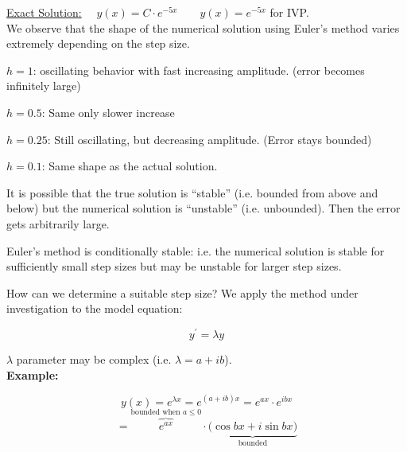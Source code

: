 \documentclass[a4paper,12pt]{report}
\begin{document}
\begin{multicols}{4}
	
	
\end{multicols}	
	\noindent \underline{Exact Solution:} $\quad y(x) = C \cdot e^{-5x} \qquad y(x) = e^{-5x}$ for IVP.\\
	
	\noindent We observe that the shape of the numerical solution using Euler's method varies extremely depending on
	the step size.
	\begin{list}{}
		\item $h = 1$: oscillating behavior with fast increasing amplitude. (error becomes infinitely large)
		\item $h = 0.5$: Same only slower increase
		\item $h = 0.25$: Still oscillating, but decreasing amplitude. (Error stays bounded)
		\item $h = 0.1$: Same shape as the actual solution.
	\end{list}
	
	
	It is possible that the true solution is ``stable'' (i.e. bounded from above and below) but the numerical solution is
	 ``unstable'' (i.e. unbounded).  Then the error gets arbitrarily large.
	 
	 \begin{center}
	 \fbox
	{
		\parbox{0.8\textwidth}{
		Euler's method is conditionally stable: i.e. the numerical solution is stable for sufficiently small step sizes but
		 may be unstable for larger step sizes.}
	}
	\end{center}
	
	How can we determine a suitable step size?  We apply the method under investigation to the model equation:
	
	$$y^\prime = \lambda y$$
	
	\noindent $\lambda$ parameter may be complex (i.e. $\lambda = a + ib$). \\
	
	\noindent \textbf{Example:}
	
	$$ y(x) = e^{ \lambda x } = e^{(a+ib)x} = e^{ax} \cdot e^{ibx} $$
	$$= \!\!\!\!\!\!  \overbrace{e^{ax}}^{\text{bounded when } a \leq 0}
	\!\!\!\!\!\! \!\!\!\!\!\!  \cdot \underbrace{ \big( \cos bx
	+ i \sin bx \big)}_{\text{bounded}}$$\\
	
\end{document}
